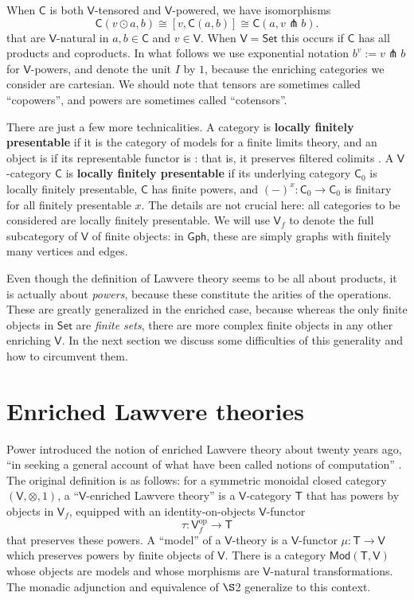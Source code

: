 \documentclass{amsart}
\newcommand{\define}[1]{{\bf \boldmath{#1}}}
\theoremstyle{definition}
\newcommand{\Gph}{\mathsf{Gph}}
\newcommand{\Set}{\mathsf{Set}}
\newcommand{\Mod}{\mathsf{Mod}}
\newcommand{\V}{\mathsf{V}}
\newcommand{\C}{\mathsf{C}}
\newcommand{\T}{\mathsf{T}}
\newcommand{\op}{\mathrm{op}}
\newcommand{\pfk}{\pitchfork}
\newcommand{\maps}{\colon}
\begin{document}
When $\C$ is both $\V$-tensored and $\V$-powered, we have isomorphisms
\begin{equation}\label{eq:co-power}
	\C(v\odot a,b) \cong \left[v, \C(a,b)\right] \cong \C(a,v \pfk b).
\end{equation}
that are  $\V$-natural in $a,b \in \C$ and $v \in \V$.  When $\V = \Set$ this occurs if $\C$ has all products and coproducts.    In what follows we use exponential notation $b^v := v\pfk b$ for $\V$-powers, and denote the unit $I$ by $1$, because the enriching categories we consider are cartesian.  We should note that tensors are sometimes called ``copowers'', and powers are sometimes called ``cotensors''.

There are just a few more technicalities. A category is \textbf{locally finitely presentable} if it is the category of models for a finite limits theory, and an object is \define{finite} if its representable functor is \define{finitary}: that is, it preserves filtered colimits \cite{adamekrosicky}.   A $\V$-category $\C$ is \textbf{locally finitely presentable} if its underlying category $\C_0$ is locally finitely presentable, $\C$ has finite powers, and $(-)^x\maps \C_0 \to \C_0$ is finitary for all finitely presentable $x$.  The details are not crucial here: all categories to be considered are locally finitely presentable. We will use  $\V_f$ to denote the full subcategory of $\V$ of finite objects: in $\Gph$, these are simply graphs with finitely many vertices and edges.

Even though the definition of Lawvere theory seems to be all about products, it is actually about \textit{powers}, because these constitute the arities of the operations. These are greatly generalized in the enriched case, because whereas the only finite objects in $\Set$ are \textit{finite sets}, there are more complex finite objects in any other enriching $\V$.  In the next section we discuss some difficulties of this generality and how to circumvent them.

\section{Enriched Lawvere theories}

Power introduced the notion of enriched Lawvere theory about twenty years ago, ``in seeking a general account of what have been called notions of computation'' \cite{power}. The original definition is as follows: for a symmetric monoidal closed category $(\V,\otimes,1)$, a ``$\V$-enriched Lawvere theory'' is a $\V$-category $\T$ that has powers by objects in $\V_f$, equipped with an identity-on-objects $\V$-functor 
\[  \tau\maps \V_f^\op \to \T \]
that preserves these powers.  A ``model'' of a $\V$-theory is a $\V$-functor $\mu\maps\T \to \V$ which preserves powers by finite objects of $\V$.  There is a category $\Mod(\T,\V)$ whose objects are models and whose morphisms are $\V$-natural transformations. The monadic adjunction and equivalence of $\S$2 generalize to this context.
\end{document}
